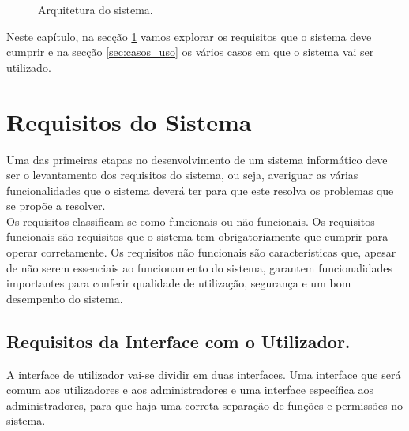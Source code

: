 \vspace{1cm} %

\begin{figure}[ht!]
\centering
{}
\caption{Arquitetura do sistema.}
\label{fig:modelo}
\end{figure}

Neste capítulo, na secção \ref{sec:req_sis} vamos explorar os requisitos que o sistema deve cumprir e na secção \ref{sec:casos_uso} os vários casos em que o sistema vai ser utilizado.

\section{Requisitos do Sistema} \label{sec:req_sis}
Uma das primeiras etapas no desenvolvimento de um sistema informático deve ser o levantamento dos requisitos do sistema, ou seja, averiguar as várias funcionalidades que o sistema deverá ter para que este resolva os problemas que se propõe a resolver.\\
Os requisitos classificam-se como funcionais ou não funcionais. Os requisitos funcionais são requisitos que o sistema tem obrigatoriamente que cumprir para operar corretamente. Os requisitos não funcionais são características que, apesar de não serem essenciais ao funcionamento do sistema, garantem funcionalidades importantes para conferir qualidade de utilização, segurança e um bom desempenho do sistema.

\subsection{Requisitos da Interface com o Utilizador.}
A interface de utilizador vai-se dividir em duas interfaces. Uma interface que será comum aos utilizadores e aos administradores e uma interface específica aos administradores, para que haja uma correta separação de funções e permissões no sistema. 

